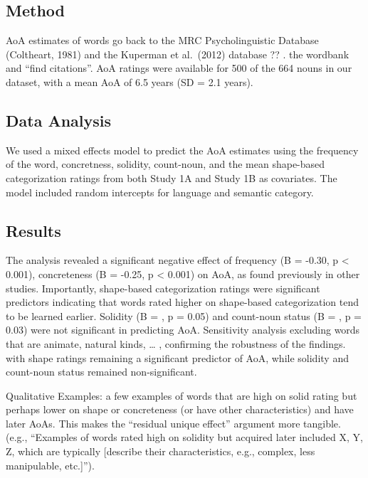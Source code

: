 \documentclass[
  english,
  man]{apa6}
\begin{document}
\subsection{Method}\label{method}

AoA estimates of words go back to the MRC Psycholinguistic Database (Coltheart, 1981) and the Kuperman et al.~(2012) database ?? . the wordbank and ``find citations''. AoA ratings were available for 500 of the 664 nouns in our dataset, with a mean AoA of 6.5 years (SD = 2.1 years).

\subsection{Data Analysis}\label{data-analysis-2}

We used a mixed effects model to predict the AoA estimates using the frequency of the word, concretness, solidity, count-noun, and the mean shape-based categorization ratings from both Study 1A and Study 1B as covariates. The model included random intercepts for language and semantic category.

\subsection{Results}\label{results-2}

The analysis revealed a significant negative effect of frequency (B = -0.30, p \textless{} 0.001), concreteness (B = -0.25, p \textless{} 0.001) on AoA, as found previously in other studies. Importantly, shape-based categorization ratings were significant predictors indicating that words rated higher on shape-based categorization tend to be learned earlier. Solidity (B = , p = 0.05) and count-noun status (B = , p = 0.03) were not significant in predicting AoA. Sensitivity analysis excluding words that are animate, natural kinds, \ldots{} , confirming the robustness of the findings. with shape ratings remaining a significant predictor of AoA, while solidity and count-noun status remained non-significant.

Qualitative Examples: a few examples of words that are high on solid rating but perhaps lower on shape or concreteness (or have other characteristics) and have later AoAs. This makes the ``residual unique effect'' argument more tangible. (e.g., ``Examples of words rated high on solidity but acquired later included X, Y, Z, which are typically {[}describe their characteristics, e.g., complex, less manipulable, etc.{]}'').
\end{document}
